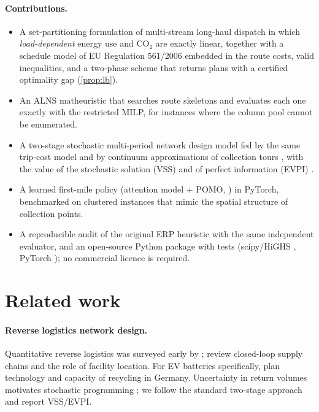 \documentclass[11pt,a4paper]{article}
\begin{document}
\paragraph{Contributions.}
\begin{itemize}
\item A set-partitioning formulation of multi-stream long-haul dispatch in which \emph{load-dependent} energy use and CO$_2$ are exactly linear, together with a schedule model of EU Regulation 561/2006 \citep{EU561} embedded in the route costs, valid inequalities, and a two-phase scheme that returns plans with a certified optimality gap (\cref{prop:lb}).
\item An ALNS matheuristic \citep{ropke2006,maniezzo2009} that searches route skeletons and evaluates each one exactly with the restricted MILP, for instances where the column pool cannot be enumerated.
\item A two-stage stochastic multi-period network design model fed by the same trip-cost model and by continuum approximations of collection tours \citep{beardwood1959,daganzo1984}, with the value of the stochastic solution (VSS) and of perfect information (EVPI) \citep{birge2011}.
\item A learned first-mile policy (attention model + POMO, \citep{kool2019,kwon2020}) in PyTorch, benchmarked on clustered instances that mimic the spatial structure of collection points.
\item A reproducible audit of the original ERP heuristic with the same independent evaluator, and an open-source Python package with tests (scipy/HiGHS \citep{huangfu2018,virtanen2020}, PyTorch \citep{paszke2019}); no commercial licence is required.
\end{itemize}

\section{Related work}
\label{sec:related}
\paragraph{Reverse logistics network design.} Quantitative reverse logistics was surveyed early by \citet{fleischmann1997}; \citet{govindan2015} review closed-loop supply chains and \citet{melo2009} the role of facility location. For EV batteries specifically, \citet{hoyer2015} plan technology and capacity of recycling in Germany. Uncertainty in return volumes motivates stochastic programming \citep{birge2011}; we follow the standard two-stage approach and report VSS/EVPI.
\end{document}
